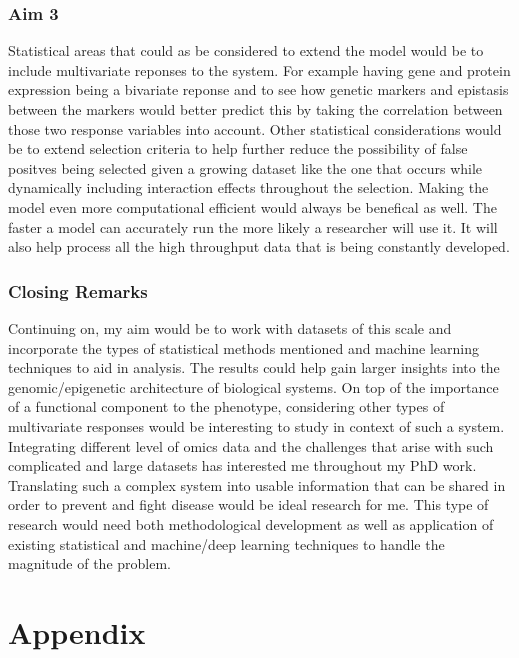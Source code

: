\documentclass[11pt,]{book}
\theoremstyle{definition}
\theoremstyle{definition}
\theoremstyle{remark}
\begin{document}
\subsection{Aim 3}\label{aim-3}

Statistical areas that could as be considered to extend the model would
be to include multivariate reponses to the system. For example having
gene and protein expression being a bivariate reponse and to see how
genetic markers and epistasis between the markers would better predict
this by taking the correlation between those two response variables into
account. Other statistical considerations would be to extend selection
criteria to help further reduce the possibility of false positves being
selected given a growing dataset like the one that occurs while
dynamically including interaction effects throughout the selection.
Making the model even more computational efficient would always be
benefical as well. The faster a model can accurately run the more likely
a researcher will use it. It will also help process all the high
throughput data that is being constantly developed.

\subsection{Closing Remarks}\label{closing-remarks}

Continuing on, my aim would be to work with datasets of this scale and
incorporate the types of statistical methods mentioned and machine
learning techniques to aid in analysis. The results could help gain
larger insights into the genomic/epigenetic architecture of biological
systems. On top of the importance of a functional component to the
phenotype, considering other types of multivariate responses would be
interesting to study in context of such a system. Integrating different
level of omics data and the challenges that arise with such complicated
and large datasets has interested me throughout my PhD work. Translating
such a complex system into usable information that can be shared in
order to prevent and fight disease would be ideal research for me. This
type of research would need both methodological development as well as
application of existing statistical and machine/deep learning techniques
to handle the magnitude of the problem.

\chapter{Appendix}\label{appendix}
\end{document}
